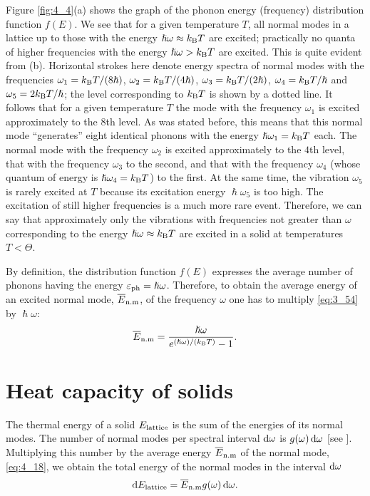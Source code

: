 Figure \ref{fig:4_4}(a) shows the graph of the phonon energy (frequency) distribution function $f(E)$. We see that for a given temperature $T$, all normal modes in a lattice up to those with the energy $\hslash\omega\approx k_{\text{B}}T$ are excited; practically no quanta of higher frequencies with the energy $\hslash\omega>k_{\text{B}}T$ are excited. This is quite evident from (b).
Horizontal strokes here denote energy spectra of normal modes with the frequencies $\omega_1=k_{\text{B}}T/(8\hslash)$, $\omega_2=k_{\text{B}}T/(4\hslash)$, $\omega_3=k_{\text{B}}T/(2\hslash)$, $\omega_4=k_{\text{B}}T/\hslash$ and $\omega_5=2k_{\text{B}}T/\hslash$; the level corresponding to $k_{\text{B}}T$ is shown by a dotted line.
It follows that for a given temperature $T$ the mode with the frequency $\omega_1$ is excited approximately to the $8$th level. As was stated before, this means that this normal mode ``generates'' eight identical phonons with the energy $\hslash\omega_1=k_{\text{B}}T$ each. The normal mode with the frequency $\omega_2$ is excited approximately to the $4$th level, that with the frequency $\omega_3$ to the
second, and that with the frequency $\omega_4$ (whose quantum of energy is $\hslash\omega_4=k_{\text{B}}T$) to the first. At the same time, the vibration $\omega_5$ is rarely
excited at $T$ because its excitation energy $\hslash\omega_5$ is too high. The excitation of still higher frequencies is a much more rare event. Therefore, we can say that approximately only the vibrations with frequencies not greater than $\omega$ corresponding to the energy $\hslash\omega\approx k_{\text{B}}T$ are excited in a solid at temperatures $T<\Theta$.

By definition, the distribution function $f(E)$ expresses the average number of phonons having the energy $\varepsilon_{\text{ph}}=\hslash\omega$. Therefore, to obtain the average energy of an excited normal mode, $\overline{E}_{\text{n.m}}$, of the frequency $\omega$ one has to multiply \eqref{eq:3_54} by $\hslash\omega$:
\begin{equation}\label{eq:4_18}
    \overline{E}_{\text{n.m}} = \frac{\hslash\omega}{e^{(\hslash\omega)/(k_{\text{B}}T)} - 1}.
\end{equation}

\section{Heat capacity of solids}\label{sec:33}

The thermal energy of a solid $E_{\text{lattice}}$ is the sum of the energies of its normal modes. The number of normal modes per spectral interval $\mathrm{d}\omega$ is $g(\omega)\,\mathrm{d}\omega$ [see ]. Multiplying this number by the average energy $\overline{E}_{\text{n.m}}$ of the normal mode, \eqref{eq:4_18}, we obtain the total energy of the normal modes in the interval $\mathrm{d}\omega$
\begin{equation*}
    \mathrm{d}E_{\text{lattice}} = \overline{E}_{\text{n.m}} g(\omega)\, \mathrm{d}\omega.
\end{equation*}

